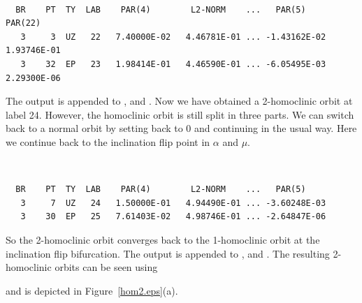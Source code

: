 \documentclass[12pt]{report}
\begin{document}
\begin{center}
 \\
\end{center} 
\begin{verbatim}
  BR    PT  TY  LAB    PAR(4)        L2-NORM    ...   PAR(5)        PAR(22)    
   3     3  UZ   22   7.40000E-02   4.46781E-01 ... -1.43162E-02   1.93746E-01
   3    32  EP   23   1.98414E-01   4.46590E-01 ... -6.05495E-03   2.29300E-06
\end{verbatim}
The output is appended to ,   and .
Now we have obtained a 2-homoclinic orbit at label 24. However, the
homoclinic orbit is still split in three parts. We can switch back to
a normal orbit by setting  back to 0 and continuing in the usual
way. Here we continue back to the inclination flip point in $\alpha$
and $\mu$.
\begin{center}
 \\
\end{center} 
\begin{verbatim}
  BR    PT  TY  LAB    PAR(4)        L2-NORM    ...   PAR(5)     
   3     7  UZ   24   1.50000E-01   4.94490E-01 ... -3.60248E-03
   3    30  EP   25   7.61403E-02   4.98746E-01 ... -2.64847E-06
\end{verbatim}
So the 2-homoclinic orbit converges back to the 1-homoclinic orbit at
the inclination flip bifurcation.
The output is appended to ,   and .
The resulting 2-homoclinic orbits can be seen using
\begin{center}
\end{center} 
and is depicted in Figure~\ref{hom2.eps}(a).
\end{document}
